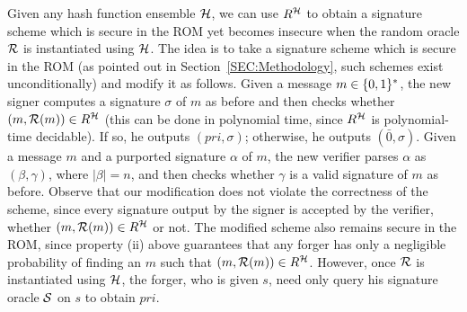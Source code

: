 Given any hash function ensemble $\mathcal{H}$, we can use $R^{\mathcal{H}}$ to obtain a
signature scheme which is secure in the ROM yet becomes insecure when the
random oracle $\mathcal{R}$ is instantiated using $\mathcal{H}$. The idea is to take a
signature scheme which is secure in the ROM (as pointed out in
Section~\ref{SEC:Methodology}, such schemes exist unconditionally) and modify
it as follows. Given a message $m \in \{0,1\}^{*}$, the new signer computes a
signature $\sigma$ of $m$ as before and then checks whether $(m,\mathcal{R}(m)) \in
R^{\mathcal{H}}$ (this can be done in polynomial time, since $R^{\mathcal{H}}$ is
polynomial-time decidable). If so, he outputs $(pri,\sigma)$; otherwise, he
outputs $(\bar{0},\sigma)$. Given a message $m$ and a purported signature
$\alpha$ of $m$, the new verifier parses $\alpha$ as $(\beta,\gamma)$, where
$|\beta| = n$, and then checks whether $\gamma$ is a valid signature of $m$ as
before.
Observe that our modification does not violate the correctness of the scheme,
since every signature output by the signer is accepted by the verifier,
whether $(m,\mathcal{R}(m)) \in R^{\mathcal{H}}$ or not.  The modified scheme also remains
secure in the ROM, since property (ii) above guarantees that any forger has
only a negligible probability of finding an $m$ such that $(m,\mathcal{R}(m)) \in
R^{\mathcal{H}}$. However, once $\mathcal{R}$ is instantiated using $\mathcal{H}$, the forger, who
is given $s$, need only query his signature oracle $\mathcal{S}$ on $s$ to obtain
$pri$. 

